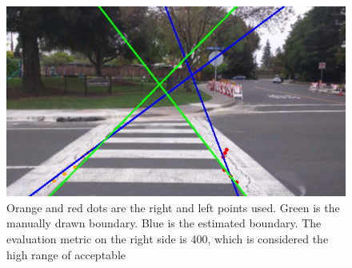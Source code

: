 \begin{figure}[t]
\begin{center}
\includegraphics[width=12cm]{figures/400RightSide.png}
\captionfonts
\caption{Orange and red dots are the right and left points used. Green is the manually drawn boundary. Blue is the estimated boundary. The evaluation metric on the right side is 400, which is considered the high range of acceptable}
\label{fig:400Metric}
\end{center}
\end{figure}